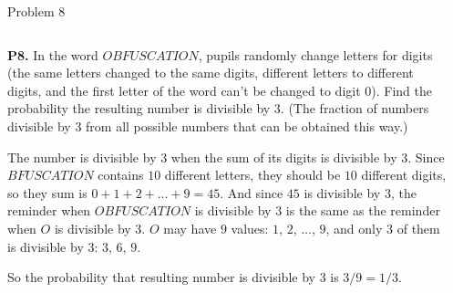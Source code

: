 \documentclass[9pt,aspectratio=169]{beamer}
\begin{document}
\begin{frame}{Problem 8}
  \begin{columns}[T]
    \begin{column}{0.5\textwidth}
      \begin{problem}
        \textbf{P8.} In the word $OBFUSCATION$, pupils randomly change letters for digits (the same letters changed to the same digits, different letters to different digits, and the first letter of the word can't be changed to digit $0$). Find the probability the resulting number is divisible by $3$. (The fraction of numbers divisible by $3$ from all possible numbers that can be obtained this way.)
      \end{problem}
      The number is divisible by $3$ when the sum of its digits is divisible by $3$.
      Since $BFUSCATION$ contains $10$ different letters, they should be $10$ different digits, so they sum is $0 + 1 + 2 + \ldots + 9 = 45$. And since $45$ is divisible by $3$, the reminder when $OBFUSCATION$ is divisible by $3$ is the same as the reminder when $O$ is divisible by $3$. $O$ may have $9$ values: $1$, $2$, $\ldots$, $9$, and only $3$ of them is divisible by $3$: $3$, $6$, $9$.

      So the probability that resulting number is divisible by $3$ is $3/9=\boxed{1/3}$.
    \end{column}
    \begin{column}{0.5\textwidth}
    \end{column}
  \end{columns}
\end{frame}
\end{document}
